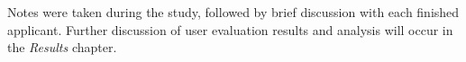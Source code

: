 Notes were taken during the study, followed by brief discussion with each finished applicant. Further discussion of user evaluation results and analysis will occur in the \emph{Results} chapter.
\afterpage{
  \clearpage
  \begin{landscape}
    
  \end{landscape}
  \clearpage
  \begin{landscape}
    

  \end{landscape}
}
